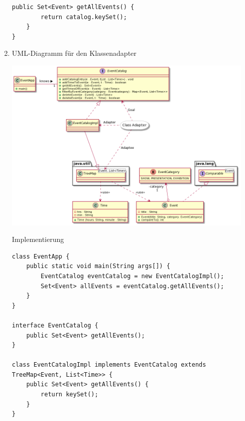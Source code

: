 \documentclass{article}
\begin{document}
\begin{enumerate}[label=(\alph*)]
\begin{lstlisting}[style=java, tabsize=2]
	public Set<Event> getAllEvents() {
		return catalog.keySet();
	}
}
		\end{lstlisting}
		\item UML-Diagramm für den Klassenadapter
		\begin{center}
			\includegraphics[width=0.95\textwidth]{./Aufgabe7_4b}
		\end{center}
		Implementierung
		\begin{lstlisting}[style=java, tabsize=2]
class EventApp {
	public static void main(String args[]) {
		EventCatalog eventCatalog = new EventCatalogImpl();
		Set<Event> allEvents = eventCatalog.getAllEvents();
	}
}

interface EventCatalog {
	public Set<Event> getAllEvents();
}

class EventCatalogImpl implements EventCatalog extends TreeMap<Event, List<Time>> {
	public Set<Event> getAllEvents() {
		return keySet();
	}
}
		\end{lstlisting}
	\end{enumerate}
\end{document}
